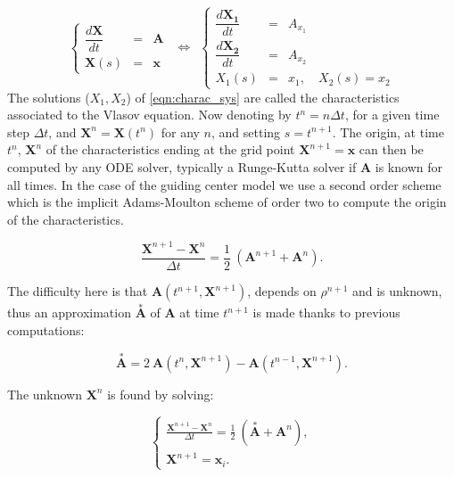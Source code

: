 \documentclass[proc]{edpsmath}
\begin{document}
\begin{equation}
	\label{eqn:charac_sys}
	\left\lbrace
	\begin{array}{lcl}
	\displaystyle \dfrac{d \mathbf{X}}{dt} &=& \mathbf{A}\\[0.3cm]
	\displaystyle \mathbf{X}(s) &=& \mathbf{x}
	\end{array}\right.
~~\Longleftrightarrow ~~
	\left\lbrace
	\begin{array}{lcl}
	\displaystyle \dfrac{d \mathbf{X_1}}{dt} &=& A_{x_1}\\[0.3cm]
	\displaystyle \dfrac{d \mathbf{X_2}}{dt} &=& A_{x_2}\\[0.3cm]
	\displaystyle X_1(s) &=& x_1, \quad   X_2(s) = x_2
	\end{array}\right.
\end{equation}
The solutions ($X_1, X_2$) of \eqref{eqn:charac_sys} are called the characteristics associated to the Vlasov equation. 
Now denoting by $t^n=n\Delta t$, for a given time step $\Delta t$, and $\mathbf{X}^n= \mathbf{X}(t^n)$ for any $n$, and setting $s=t^{n+1}$. The origin, at time $t^n$, $ \mathbf{X}^n$ of the characteristics ending at the grid point $ \mathbf{X}^{n+1}= \mathbf{x}$ can then be computed by any ODE solver, typically a Runge-Kutta solver if  $ \mathbf{A}$ is known for all times. In the case of the guiding  center model we use a second order scheme which is the implicit Adams-Moulton scheme of order two to compute the origin of the characteristics.

 \begin{equation*}
 	 \displaystyle{ \frac{\textbf{X}^{n+1}-\textbf{X}^{n}}{ \Delta t } =\frac{1}{2} ~( \textbf{A}^{n+1}+\textbf{A}^{n} ) }.
 \end{equation*} 
 
\noindent The difficulty here is that  $\textbf{A}(t^{n+1},\textbf{X}^{n+1})$, depends on $\rho^{n+1}$ and is unknown, thus an approximation $\overset{*}{\textbf{A}}$ of    $\textbf{A}$ at time $t^{n+1}$ is made thanks to previous computations:
 
 \begin{equation*}
\overset{*}{\textbf{A}}= 2~\textbf{A}(t^{n},\textbf{X}^{n+1}) -  \textbf{A}(t^{n-1},\textbf{X}^{n+1}).
 \end{equation*} 
 
\noindent The unknown $\textbf{X}^{n}$ is found by solving:
 
 
 \begin{equation*}
 	\begin{cases}
 	 \displaystyle{ \frac{\textbf{X}^{n+1}-\textbf{X}^{n}}{ \Delta t } =\frac{1}{2} ~(\overset{*}{\textbf{A}}+\textbf{A}^{n} ) },\\[3.5mm]
 	 \textbf{X}^{n+1}=\textbf{x}_i .
 	\end{cases}
 \end{equation*}
 
\end{document}
